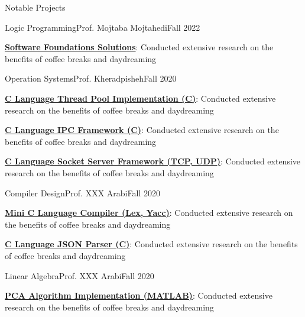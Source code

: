 \documentclass[]{main}
\begin{document}
\begin{section}{Notable Projects}
 \begin{subsection}{Logic Programming}{Prof. Mojtaba Mojtahedi}{Fall 2022}{}
     \item \textbf{\href{https://github.com/ckoliber/sfexercises}{Software Foundations Solutions}}: Conducted extensive research on the benefits of coffee breaks and daydreaming
 \end{subsection}

 \begin{subsection}{Operation Systems}{Prof. Kheradpisheh}{Fall 2020}{}
     \item \textbf{\href{https://github.com/ckoliber/Kprocessor}{C Language Thread Pool Implementation (C)}}: Conducted extensive research on the benefits of coffee breaks and daydreaming
     \item \textbf{\href{https://github.com/ckoliber/Kipc}{C Language IPC Framework (C)}}: Conducted extensive research on the benefits of coffee breaks and daydreaming
     \item \textbf{\href{https://github.com/ckoliber/Knet}{C Language Socket Server Framework (TCP, UDP)}}: Conducted extensive research on the benefits of coffee breaks and daydreaming
 \end{subsection}

 \begin{subsection}{Compiler Design}{Prof. XXX Arabi}{Fall 2020}{}
     \item \textbf{\href{https://github.com/ckoliber/minicc}{Mini C Language Compiler (Lex, Yacc)}}: Conducted extensive research on the benefits of coffee breaks and daydreaming
     \item \textbf{\href{https://github.com/ckoliber/Kson}{C Language JSON Parser (C)}}: Conducted extensive research on the benefits of coffee breaks and daydreaming
 \end{subsection}

 \begin{subsection}{Linear Algebra}{Prof. XXX Arabi}{Fall 2020}{}
     \item \textbf{\href{https://github.com/ckoliber/pca}{PCA Algorithm Implementation (MATLAB)}}: Conducted extensive research on the benefits of coffee breaks and daydreaming
 \end{subsection}


\end{section}
\end{document}
